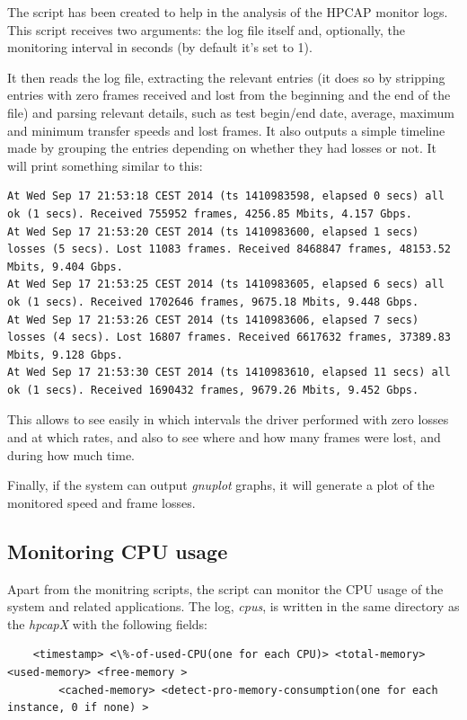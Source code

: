 \documentclass[a4paper,oneside]{hpman}
\begin{document}
The script  has been created to help in the analysis of the HPCAP monitor logs. This script receives two arguments: the log file itself and, optionally, the monitoring interval in seconds (by default it's set to 1).

It then reads the log file, extracting the relevant entries (it does so by stripping entries with zero frames received and lost from the beginning and the end of the file) and parsing relevant details, such as test begin/end date, average, maximum and minimum transfer speeds and lost frames. It also outputs a simple timeline made by grouping the entries depending on whether they had losses or not. It will print something similar to this:

\begin{lstlisting}
At Wed Sep 17 21:53:18 CEST 2014 (ts 1410983598, elapsed 0 secs) all ok (1 secs). Received 755952 frames, 4256.85 Mbits, 4.157 Gbps.
At Wed Sep 17 21:53:20 CEST 2014 (ts 1410983600, elapsed 1 secs) losses (5 secs). Lost 11083 frames. Received 8468847 frames, 48153.52 Mbits, 9.404 Gbps.
At Wed Sep 17 21:53:25 CEST 2014 (ts 1410983605, elapsed 6 secs) all ok (1 secs). Received 1702646 frames, 9675.18 Mbits, 9.448 Gbps.
At Wed Sep 17 21:53:26 CEST 2014 (ts 1410983606, elapsed 7 secs) losses (4 secs). Lost 16807 frames. Received 6617632 frames, 37389.83 Mbits, 9.128 Gbps.
At Wed Sep 17 21:53:30 CEST 2014 (ts 1410983610, elapsed 11 secs) all ok (1 secs). Received 1690432 frames, 9679.26 Mbits, 9.452 Gbps.
\end{lstlisting}

This allows to see easily in which intervals the driver performed with zero losses and at which rates, and also to see where and how many frames were lost, and during how much time.

Finally, if the system can output \textit{gnuplot} graphs, it will generate a plot of the monitored speed and frame losses.

\subsection{Monitoring CPU usage}

Apart from the monitring scripts, the script  can monitor the CPU usage of the system and related applications. The log, \textit{cpus}, is written in the same directory as the \textit{hpcapX} with the following fields:

\begin{verbatim}
    <timestamp> <\%-of-used-CPU(one for each CPU)> <total-memory> <used-memory> <free-memory >
        <cached-memory> <detect-pro-memory-consumption(one for each instance, 0 if none) >
\end{verbatim}
\end{document}

